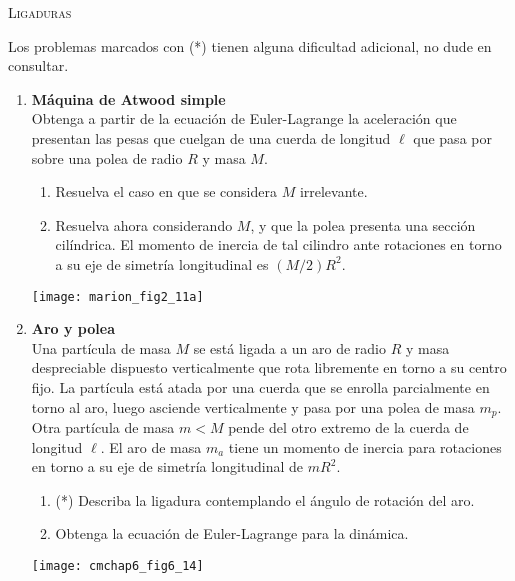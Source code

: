 \documentclass[11pt, spanish, a4paper, twoside]{article}
\begin{document}
\begin{center}
  \textsc{\large Ligaduras}
\end{center}

\noindent
Los problemas marcados con (*) tienen alguna dificultad adicional, no dude en consultar.
\begin{enumerate}


\item 
\begin{minipage}[t][4.5cm]{0.68\textwidth}
	\textbf{Máquina de Atwood simple}\\
	Obtenga a partir de la ecuación de Euler-Lagrange la aceleración que presentan las pesas que cuelgan de una cuerda de longitud \(\ell\) que pasa por sobre una polea de radio \(R\) y masa \(M\).
	\begin{enumerate}
		\item Resuelva el caso en que se considera \(M\) irrelevante.
		\item Resuelva ahora considerando \(M\), y que la polea presenta una sección cilíndrica.
			El momento de inercia de tal cilindro ante rotaciones en torno a su eje de simetría longitudinal es \((M/2) R^2\).
	\end{enumerate}
\end{minipage}
\begin{minipage}[c][0cm][t]{0.3\textwidth}
	\texttt{[image: marion\_fig2\_11a]}
\end{minipage}


\item 
\begin{minipage}[t][5cm]{0.75\textwidth}
\textbf{Aro y polea}\\
	Una partícula de masa \(M\) se está ligada a un aro de radio \(R\) y masa despreciable dispuesto verticalmente que rota libremente en torno a su centro fijo.
	La partícula está atada por una cuerda que se enrolla parcialmente en torno al aro, luego asciende verticalmente y pasa por una polea de masa \(m_p\).
	Otra partícula de masa \(m < M\) pende del otro extremo de la cuerda de longitud \(\ell\).
	El aro de masa \(m_a\) tiene un momento de inercia para rotaciones en torno a su eje de simetría longitudinal de \(m R^2\).
	\begin{enumerate}
		\item (*) Describa la ligadura contemplando el ángulo de rotación del aro.
		\item Obtenga la ecuación de Euler-Lagrange para la dinámica.
\end{enumerate}
\end{minipage}
\begin{minipage}[c][0cm][t]{0.2\textwidth}
	\texttt{[image: cmchap6\_fig6\_14]}
\end{minipage}



\end{enumerate}
\end{document}
